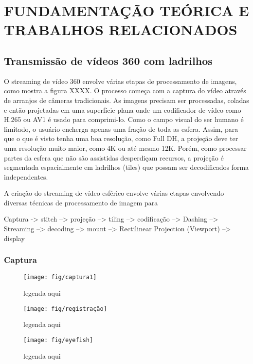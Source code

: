 
\chapter{FUNDAMENTAÇÃO TEÓRICA E TRABALHOS RELACIONADOS}\label{Cap:Foundations}

\section{Transmissão de vídeos 360 com ladrilhos}

O streaming de vídeo 360 envolve várias etapas de processamento de imagens, como mostra a figura XXXX. O processo começa com a captura do vídeo através de arranjos de câmeras tradicionais. As imagens precisam ser processadas, coladas e então projetadas em uma superfície plana onde um codificador de vídeo como H.265 ou AV1 é usado para comprimi-lo. Como o campo visual do ser humano é limitado, o usuário encherga apenas uma fração de toda as esfera. Assim, para que o que é visto tenha uma boa resolução, como Full DH, a projeção deve ter uma resolução muito maior, como 4K ou até mesmo 12K. Porém, como processar partes da esfera que não são assistidas desperdiçam recursos, a projeção é segmentada espacialmente em ladrilhos (tiles) que possam ser decodificados forma independentes.

A criação do streaming de vídeo esférico envolve várias etapas envolvendo diversas técnicas de processamento de imagem para

Captura -> stitch --> projeção --> tiling --> codificação -->  Dashing --> Streaming --> decoding --> mount --> Rectilinear Projection (Viewport) --> display

\subsection{Captura}

\begin{figure}[tbh]
	\centering
	\texttt{[image: fig/captura1]}
	\caption{legenda aqui}
	\label{fig:captura1}
\end{figure}

\begin{figure}[tbh]
	\centering
	\texttt{[image: fig/registração]}
	\caption{legenda aqui}
	\label{fig:registracao}
\end{figure}

\begin{figure}[tbh]
	\centering
	\texttt{[image: fig/eyefish]}
	\caption{legenda aqui}
	\label{fig:eyefish}
\end{figure}

